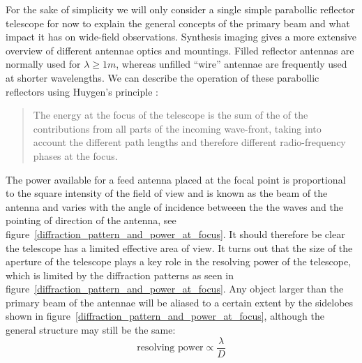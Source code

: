 \documentclass[a4paper,10pt]{report}
\begin{document}
For the sake of simplicity we will only consider a single simple parabollic reflector telescope for now to explain the general concepts of the primary beam and what impact it has on wide-field observations. Synthesis imaging \cite[ch. 3]{taylor1999synthesis} 
gives a more extensive overview of different antennae optics and mountings. Filled reflector antennas are normally used for $\lambda \geq 1m$, whereas unfilled ``wire'' antennae are frequently used at shorter wavelengths. We can describe
the operation of these parabollic reflectors using Huygen's principle \cite{christiansenradiotelescopes}: 
\begin{quote}
The energy at the focus of the telescope is the sum of the of the contributions from all parts of the incoming wave-front, taking into account the different path lengths and therefore different radio-frequency phases at the focus.
\end{quote}
The power available for a feed antenna placed at the focal point is proportional to the square intensity of the field of view and is known as the beam of the antenna and varies with the angle of incidence betweeen the the waves and the pointing of
direction of the antenna, see figure~\ref{diffraction_pattern_and_power_at_focus}. It should therefore be clear the telescope has a limited effective area of view. It turns out that the size of the aperture of the telescope plays a key role
in the resolving power of the telescope, which is limited by the diffraction patterns as seen in figure~\ref{diffraction_pattern_and_power_at_focus}. Any object larger than the primary beam of the antennae will be aliased to a certain
extent by the sidelobes shown in figure~\ref{diffraction_pattern_and_power_at_focus}, although the general structure may still be the same:
\begin{equation*}
 \text{resolving power} \propto \frac{\lambda}{D}
\end{equation*}
\end{document}
